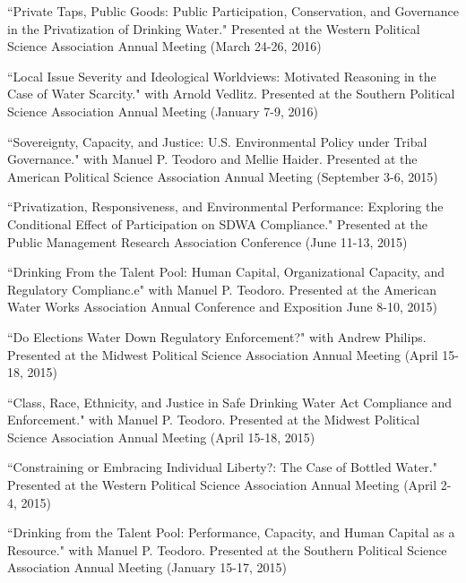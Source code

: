\documentclass[margin]{res} %
\begin{document}
\begin{resume}
\begin{hangparas}{.25in}{1}
 ``Private Taps, Public Goods: Public Participation, Conservation, and Governance in the Privatization of Drinking Water."  Presented at the Western Political Science Association Annual Meeting (March 24-26, 2016)

``Local Issue Severity and Ideological Worldviews: Motivated Reasoning in the Case of Water Scarcity." with Arnold Vedlitz. Presented at the Southern Political Science Association Annual Meeting (January 7-9, 2016) 	

``Sovereignty, Capacity, and Justice: U.S. Environmental Policy under Tribal Governance." with Manuel P. Teodoro and Mellie Haider. Presented at the American Political Science Association Annual Meeting (September 3-6, 2015) 	

``Privatization, Responsiveness, and Environmental Performance: Exploring the Conditional Effect of Participation on SDWA Compliance." Presented at the Public Management Research Association Conference (June 11-13, 2015) 	

``Drinking From the Talent Pool: Human Capital, Organizational Capacity, and Regulatory Complianc.e" with Manuel P. Teodoro. Presented at the American Water Works Association Annual Conference and Exposition June 8-10, 2015) 	

``Do Elections Water Down Regulatory Enforcement?" with Andrew Philips. Presented at the Midwest Political Science Association Annual Meeting (April 15-18, 2015) 	

``Class, Race, Ethnicity, and Justice in Safe Drinking Water Act Compliance and Enforcement." with Manuel P. Teodoro. Presented at the Midwest Political Science Association Annual Meeting (April 15-18, 2015) 	

``Constraining or Embracing Individual Liberty?: The Case of Bottled Water."  Presented at the Western Political Science Association Annual Meeting (April 2-4, 2015) 	

``Drinking from the Talent Pool: Performance, Capacity, and Human Capital as a Resource." with Manuel P. Teodoro. Presented at the Southern Political Science Association Annual Meeting (January 15-17, 2015) 	\end{hangparas}












\end{resume}
\end{document}
